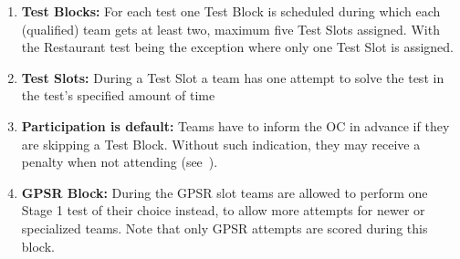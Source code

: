 \begin{enumerate}
	\item \textbf{Test Blocks:} For each test one Test Block is scheduled during which each (qualified) team gets at least two, maximum five Test Slots assigned. With the Restaurant test being the exception where only one Test Slot is assigned.
	
	\item \textbf{Test Slots:} During a Test Slot a team has one attempt to solve the test in the test's specified amount of time 
	
	\item \textbf{Participation is default:} Teams have to inform the OC in advance if they are skipping a Test Block. Without such indication, they may receive a penalty when not attending (see~).
	
	\item \textbf{GPSR Block: } During the GPSR slot teams are allowed to perform one Stage 1 test of their choice instead, to allow more attempts for newer or specialized teams. Note that only GPSR attempts are scored during this block. 
\end{enumerate}

